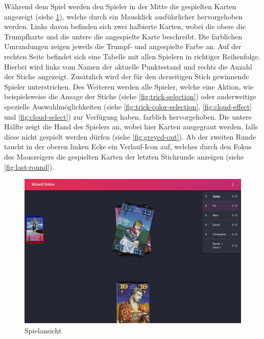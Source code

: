 Während dem Spiel werden den Spieler in der Mitte die gespielten Karten angezeigt (siehe \cref{fig:game-view}), welche durch ein Mausklick ausführlicher hervorgehoben werden. Links davon befinden sich zwei halbierte Karten, wobei die obere die Trumpfkarte und die untere die angespielte Karte beschreibt. Die farblichen Umrandungen zeigen jeweils die Trumpf- und angespielte Farbe an. Auf der rechten Seite befindet sich eine Tabelle mit allen Spielern in richtiger Reihenfolge. Hierbei wird links vom Namen der aktuelle Punktestand und rechts die Anzahl der Stiche angezeigt. Zusätzlich wird der für den derzeitigen Stich gewinnende Spieler unterstrichen. Des Weiteren werden alle Spieler, welche eine Aktion, wie beispielsweise die Ansage der Stiche (siehe \cref{fig:trick-selection}) oder anderweitige spezielle Auswahlmöglichkeiten (siehe \cref{fig:trick-color-selection}, \cref{fig:cloud-effect} und \cref{fig:cloud-select}) zur Verfügung haben, farblich hervorgehoben. Die untere Hälfte zeigt die Hand des Spielers an, wobei hier Karten ausgegraut werden, falls diese nicht gespielt werden dürfen (siehe \cref{fig:greyed-out}). Ab der zweiten Runde taucht in der oberen linken Ecke ein Verlauf-Icon auf, welches durch den Fokus des Mauszeigers die gespielten Karten der letzten Stichrunde anzeigen (siehe \cref{fig:last-round}).

\begin{figure}[h]
	\includegraphics[width=\textwidth]{images/game.png}
	\caption{Spielansicht}
	\label{fig:game-view}
\end{figure}

